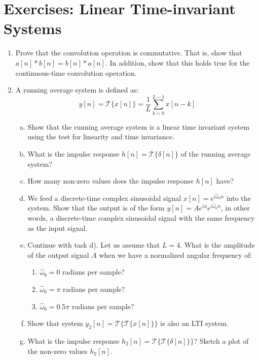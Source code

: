 \newpage
\section{Exercises: Linear Time-invariant Systems}
\begin{enumerate}

\item Prove that the convolution operation is commutative. That is, show that $a[n]*b[n]=b[n]*a[n]$. In addition, show that this holds true for the continuous-time convolution operation. 

\item A running average system is defined as:
  \begin{equation}
    y[n] = \mathcal{T}\{x[n]\} = \frac{1}{L}\sum_{k=0}^{L-1} x[n-k]
  \end{equation}

  \begin{enumerate}[a)]
    \item Show that the running average system is a linear time
      invariant system using the test for linearity and time
      invariance.
    \item What is the impulse response $h[n] =
      \mathcal{T}\{\delta[n]\}$ of the running average system?
    \item How many non-zero values does the impulse response $h[n]$ have?
    \item We feed a discrete-time complex sinusoidal signal
      $x[n]=e^{i\hat{\omega}_0 n}$ into the system. Show that the
      output is of the form $y[n]=A e^{i\phi} e^{i\hat{\omega}_0 n}$,
      in other words, a discrete-time complex sinusoidal signal with
      the same frequency as the input signal.
      \item Continue with task d). Let us assume that
        $L=4$. What is the amplitude of the output signal $A$ when we
        have a normalized angular frequency of:
        \begin{enumerate}
        \item $\hat{\omega}_0 = 0$ radians per sample?
        \item $\hat{\omega}_0 = \pi$ radians per sample?
        \item $\hat{\omega}_0 = 0.5\pi$ radians per sample?          
        \end{enumerate}
      
    \item Show that system $y_2[n]=\mathcal{T}\{ \mathcal{T}\{x[n]\} \}$ is also an LTI system.
    \item What is the impulse response $h_2[n]=\mathcal{T}\{\mathcal{T}\{\delta[n]\}\}$? Sketch a plot of the non-zero values $h_2[n]$.
  \end{enumerate}
  

\end{enumerate}
